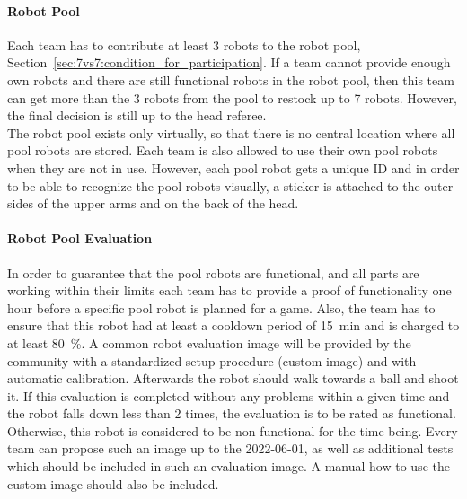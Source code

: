         \paragraph{Robot Pool}
            Each team has to contribute at least 3 robots to the robot pool, \cf Section~\ref{sec:7vs7:condition_for_participation}. If a team cannot provide enough own robots and there are still functional robots in the robot pool, then this team can get more than the 3 robots from the pool to restock up to 7 robots. However, the final decision is still up to the head referee. \\
            The robot pool exists only virtually, so that there is no central location where all pool robots are stored. Each team is also allowed to use their own pool robots when they are not in use. However, each pool robot gets a unique ID and in order to be able to recognize the pool robots visually, a sticker is attached to the outer sides of the upper arms and on the back of the head.

        \paragraph{Robot Pool Evaluation}
            \label{sec:robot_pool_evaluation}
            In order to guarantee that the pool robots are functional, and all parts are working within their limits each team has to provide a proof of functionality one hour before a specific pool robot is planned for a game. Also, the team has to ensure that this robot had at least a cooldown period of \qty{15}{\minute} and is charged to at least \qty{80}{\percent}.
            A common robot evaluation image will be provided by the community with a standardized setup procedure (custom image) and with automatic calibration. Afterwards the robot should walk towards a ball and shoot it. If this evaluation is completed without any problems within a given time  and the robot falls down less than 2 times, the evaluation is to be rated as functional. Otherwise, this robot is considered to be non-functional for the time being. Every team can propose such an image up to the 2022-06-01, as well as additional tests which should be included in such an evaluation image. A manual how to use the custom image should also be included.

